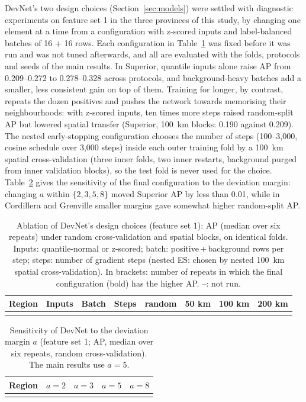 \documentclass[pdflatex,sn-apa]{sn-jnl}
\begin{document}
\begin{appendices}
DevNet's two design choices (Section~\ref{sec:models}) were settled with diagnostic experiments on feature set 1 in the three provinces of this study, by changing one element at a time from a configuration with z-scored inputs and label-balanced batches of 16 + 16 rows. Each configuration in Table~\ref{tab:ablation} was fixed before it was run and was not tuned afterwards, and all are evaluated with the folds, protocols and seeds of the main results. In Superior, quantile inputs alone raise AP from 0.209--0.272 to 0.278--0.328 across protocols, and background-heavy batches add a smaller, less consistent gain on top of them. Training for longer, by contrast, repeats the dozen positives and pushes the network towards memorising their neighbourhoods: with z-scored inputs, ten times more steps raised random-split AP but lowered spatial transfer (Superior, 100~km blocks: 0.190 against 0.209). The nested early-stopping configuration chooses the number of steps (100--3,000, cosine schedule over 3,000 steps) inside each outer training fold by a 100~km spatial cross-validation (three inner folds, two inner restarts, background purged from inner validation blocks), so the test fold is never used for the choice. Table~\ref{tab:margin} gives the sensitivity of the final configuration to the deviation margin: changing $a$ within $\{2, 3, 5, 8\}$ moved Superior AP by less than 0.01, while in Cordillera and Grenville smaller margins gave somewhat higher random-split AP.

\begin{table}[!h]
\caption{Ablation of DevNet's design choices (feature set 1): AP (median over six repeats) under random cross-validation and spatial blocks, on identical folds. Inputs: quantile-normal or z-scored; batch: positive\,+\,background rows per step; steps: number of gradient steps (nested ES: chosen by nested 100~km spatial cross-validation). In brackets: number of repeats in which the final configuration (bold) has the higher AP. --: not run.}\label{tab:ablation}
\scriptsize
\setlength{\tabcolsep}{2.5pt}
\begin{tabular*}{\textwidth}{@{\extracolsep\fill}llllllll}
\toprule
Region & Inputs & Batch & Steps & random & 50 km & 100 km & 200 km \\
\midrule
\botrule
\end{tabular*}
\end{table}

\begin{table}[!h]
\caption{Sensitivity of DevNet to the deviation margin $a$ (feature set 1; AP, median over six repeats, random cross-validation). The main results use $a = 5$.}\label{tab:margin}
\footnotesize
\begin{tabular*}{0.7\textwidth}{@{\extracolsep\fill}lcccc}
\toprule
Region & $a = 2$ & $a = 3$ & $a = 5$ & $a = 8$ \\
\midrule
\botrule
\end{tabular*}
\end{table}

\end{appendices}

\clearpage


\end{document}
